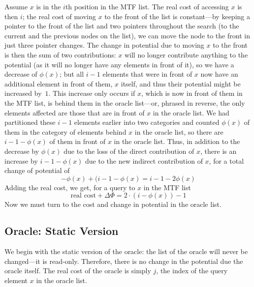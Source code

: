 \documentclass{article}
\begin{document}
Assume $x$ is in the $i$th position in the MTF list.  The real cost of
accessing $x$ is then $i$; the real cost of moving $x$ to the front
of the list is constant---by keeping a pointer to the front of the list
and two pointers throughout the search (to the current and the previous
nodes on the list), we can move the node to the front in just three
pointer changes.  The change in potential due to moving $x$
to the front is then the sum of two contributions: $x$ will no longer
contribute anything to the potential (as it will no longer have
any elements in front of it), so we have a decrease of $\phi(x)$; but
all $i-1$ elements that were in front of $x$ now have an additional element
in front of them, $x$ itself, and thus their potential might be increased
by~$1$.  This increase only occurs if $x$, which is now in front of them
in the MTF list, is behind them in the oracle list---or, phrased in reverse,
the only elements affected are those that are in front of $x$ in the oracle
list.  We had partitioned
these $i-1$ elements earlier into two categories and counted $\phi(x)$
of them in the category of elements behind $x$ in the oracle list, so
there are $i-1-\phi(x)$ of them in front of $x$ in the oracle list.  Thus,
in addition to the decrease by $\phi(x)$ due to the loss of the direct
contribution of $x$, there is an increase by $i-1-\phi(x)$ due to the new
indirect contribution of $x$, for a total change of potential of
  $$-\phi(x) + (i-1-\phi(x) = i-1-2\phi(x)$$
Adding the real cost, we get, for a query to $x$ in the MTF list
  $$\text{real cost} + \Delta\Phi = 2\cdot (i-\phi(x))-1$$
Now we must turn to the cost and change in potential in the oracle list.

\subsection{Oracle: Static Version}
\label{sec;static}
We begin with the static version of the oracle: the list of the oracle
will never be changed---it is read-only. Therefore, there is no change
in the potential due the oracle itself.  The real cost of the oracle
is simply $j$, the index of the query element $x$ in the oracle list.
\end{document}
